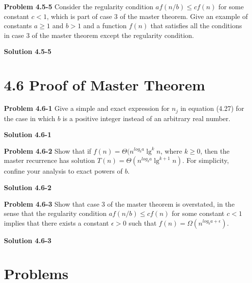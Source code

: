 \documentclass{article}
\begin{document}
\medskip

\textbf{Problem 4.5-5} Consider the regularity condition $af(n/b) \leq  cf(n)$ for some constant $c < 1$, which is part of case 3 of the master theorem. Give an example of constants $a \geq 1$ and $b > 1$ and a function $f(n)$ that satisfies all the conditions in case 3 of the master theorem except the regularity condition.

\medskip

\textbf{Solution 4.5-5}

\hrulefill

\section*{4.6 Proof of Master Theorem}

\hrulefill

\medskip

\textbf{Problem 4.6-1} Give a simple and exact expression for $n_j$  in equation (4.27) for the case in which $b$ is a positive integer instead of an arbitrary real number.

\medskip

\textbf{Solution 4.6-1}

\hrulefill

\medskip

\textbf{Problem 4.6-2} Show that if $f(n) = \Theta(n^{log_b a}\lg^k n$, where $k \geq 0$, then the master recurrence has solution $T(n) = \Theta(n^{log_b a}\lg^{k+1} n)$. For simplicity, confine your analysis to exact powers of $b$.

\medskip

\textbf{Solution 4.6-2}

\hrulefill

\medskip

\textbf{Problem 4.6-3} Show that case 3 of the master theorem is overstated, in the sense that the regularity condition $af(n/b) \leq cf(n)$ for some constant $c < 1$ implies that there exists a constant $\epsilon > 0$ such that $f(n) = \Omega(n^{log_b a + \epsilon})$.

\medskip

\textbf{Solution 4.6-3}

\hrulefill

\section*{Problems}

\hrulefill

\medskip
\end{document}
